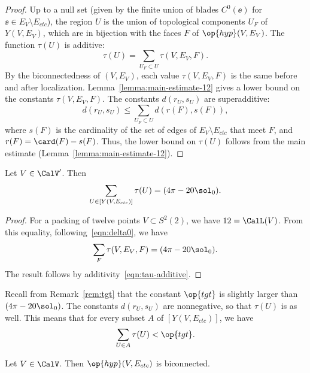 \begin{proof}
Up to a null set (given by the finite union of blades $C^0(\ee)$ for
$\ee\in E_V\setminus E_{ctc}$), the region $U$ is the union of topological
components $U_F$ of $Y(V,E_V)$, which are in bijection with the faces
$F$ of $\op{hyp}(V,E_V)$.  The function $\tau(U)$ is additive:
\begin{equation}\label{eqn:tau-additive}
\tau(U) = \sum_{U_F\subset U} \tau(V,E_V,F).
\end{equation}
By the biconnectedness of $(V,E_V)$, each value $\tau(V,E_V,F)$ is the
same before and after localization.
Lemma~\ref{lemma:main-estimate-12} gives a lower bound on the
constants $\tau(V,E_V,F)$.  The constants $d(r_U,s_U)$ are superadditive:
\[
d(r_U,s_U) \le \sum_{U_F\subset U} d(r(F),s(F)),
\]
where $s(F)$ is the cardinality of the set of edges of $E_V\setminus
E_{ctc}$ that meet $F$, and $r(F) = \card(F)-s(F)$.  Thus, the 
lower bound on $\tau(U)$ follows from the main estimate
(Lemma~\ref{lemma:main-estimate-12}).
\end{proof}

\begin{lemma}[] Let $V\in \CalV'$.  Then
\[
\sum_{U\in [Y(V,E_{ctc})]} \tau(U) = (4\pi - 20\sol_0).
\]
\end{lemma}

%
\begin{proof} For a packing of twelve points $V\subset S^2(2)$, we have
$12=\CalL(V)$.   From this equality, following~\eqref{eqn:delta0}, we have
\[
  \sum_F \tau (V,E_{V},F) = (4\pi - 20\sol_0). 
\]
The result follows by additivity~\eqref{eqn:tau-additive}.
\end{proof}

Recall from Remark~\ref{rem:tgt} that the constant $\op{tgt}$ is slightly
larger than $(4\pi-20\sol_0)$.  The constants $d(r_U,s_U)$ are nonnegative, so that
$\tau(U)$ is as well.  This means that for every subset
$A$ of $[Y(V,E_{ctc})]$, we have
\begin{equation}\label{eqn:subtgt}
\sum_{U\in A} \tau(U) < \op{tgt}.
\end{equation}



\begin{lemma}[biconnected]\label{lemma:biconnected}
  Let $V\in \CalV$.  Then $\op{hyp}(V,E_{ctc})$ is biconnected.
\end{lemma}

